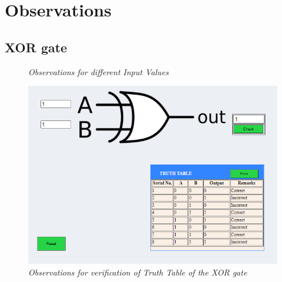\section{Observations}
	\subsection{XOR gate}
			\begin{figure}[ht]
				\centering 
				\hfill
				\caption{\textit{Observations for different Input Values}}
			\end{figure}
			\begin{figure}[h]
				\centering
				\includegraphics[width=0.85\linewidth]{img/exp3/fig9}
				\caption{\textit{Observations for verification of Truth Table of the XOR gate}}
				\label{fig:xor_obs_2}
			\end{figure}

